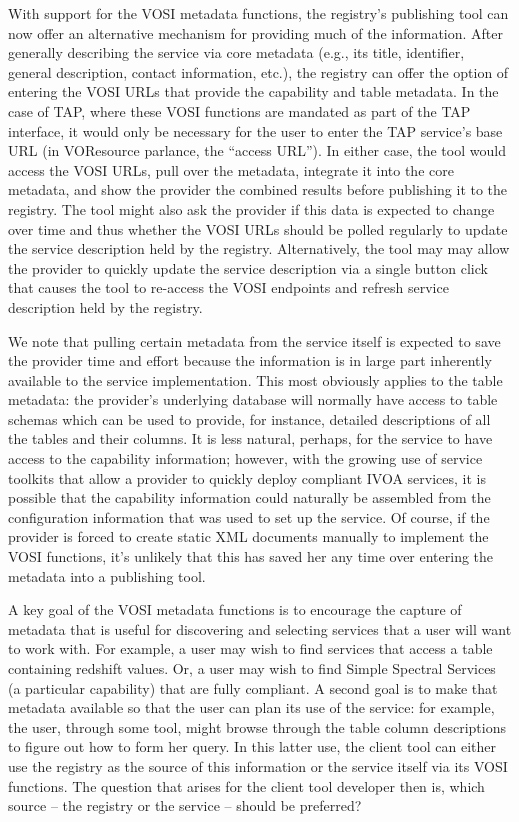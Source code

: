 \documentclass[11pt,letter]{ivoa}
\begin{document}
With support for the VOSI metadata functions, the registry's publishing
tool can now offer an alternative mechanism for providing much of the
information. After generally describing the service via core metadata
(e.g., its title, identifier, general description, contact information,
etc.), the registry can offer the option of entering the VOSI URLs that
provide the capability and table metadata. In the case of TAP, where
these VOSI functions are mandated as part of the TAP interface, it would
only be necessary for the user to enter the TAP service's base URL (in
VOResource parlance, the ``access URL''). In either case, the tool would
access the VOSI URLs, pull over the metadata, integrate it into the core
metadata, and show the provider the combined results before publishing
it to the registry. The tool might also ask the provider if this data is
expected to change over time and thus whether the VOSI URLs should be
polled regularly to update the service description held by the registry.
Alternatively, the tool may may allow the provider to quickly update the
service description via a single button click that causes the tool to
re-access the VOSI endpoints and refresh service description held by the
registry.

We note that pulling certain metadata from the service itself is
expected to save the provider time and effort because the information is
in large part inherently available to the service implementation. This
most obviously applies to the table metadata: the provider's underlying
database will normally have access to table schemas which can be used to
provide, for instance, detailed descriptions of all the tables and their
columns. It is less natural, perhaps, for the service to have access to
the capability information; however, with the growing use of service
toolkits that allow a provider to quickly deploy compliant IVOA
services, it is possible that the capability information could naturally
be assembled from the configuration information that was used to set up
the service. Of course, if the provider is forced to create static XML
documents manually to implement the VOSI functions, it's unlikely that
this has saved her any time over entering the metadata into a publishing
tool.

A key goal of the VOSI metadata functions is to encourage the capture of
metadata that is useful for discovering and selecting services that a
user will want to work with. For example, a user may wish to find
services that access a table containing redshift values. Or, a user may
wish to find Simple Spectral Services (a particular capability) that are
fully compliant. A second goal is to make that metadata available so
that the user can plan its use of the service: for example, the user,
through some tool, might browse through the table column descriptions to
figure out how to form her query. In this latter use, the client tool
can either use the registry as the source of this information or the
service itself via its VOSI functions. The question that arises for the
client tool developer then is, which source -- the registry or the
service -- should be preferred?
\end{document}

